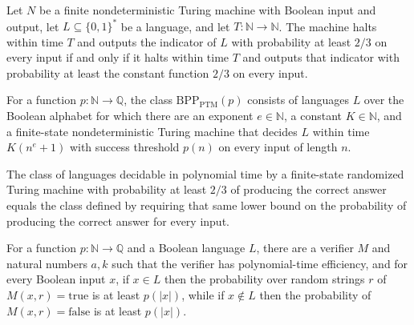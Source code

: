 \begin{theorem}
\label{Turing.FinNDTM.bpDecidesInTime_iff_with}
\leanok
{}
Let $N$ be a finite nondeterministic Turing machine with Boolean input and output, let
$L\subseteq\{0,1\}^*$ be a language, and let $T:\mathbb{N}\to\mathbb{N}$. The machine
halts within time $T$ and outputs the indicator of $L$ with probability at least $2/3$
on every input if and only if it halts within time $T$ and outputs that indicator with
probability at least the constant function $2/3$ on every input.
\end{theorem}

\begin{definition}
\label{Randomized.BPP_PTMWith}
\leanok
{}
For a function $p\colon\mathbb{N}\to\mathbb{Q}$, the class
$\mathrm{BPP}_{\mathrm{PTM}}(p)$ consists of languages $L$ over the Boolean alphabet for
which there are an exponent $e\in\mathbb{N}$, a constant $K\in\mathbb{N}$, and a
finite-state nondeterministic Turing machine that decides $L$ within time $K(n^e+1)$
with success threshold $p(n)$ on every input of length $n$.
\end{definition}

\begin{theorem}
\label{Randomized.BPP_PTM_eq_BPP_PTMWith}
\leanok
{}
The class of languages decidable in polynomial time by a finite-state randomized Turing
machine with probability at least $2/3$ of producing the correct answer equals the class
defined by requiring that same lower bound on the probability of producing the correct
answer for every input.
\end{theorem}

\begin{definition}
\label{Randomized.InBPPWith}
\leanok
{}
For a function $p\colon\mathbb{N}\to\mathbb{Q}$ and a Boolean language $L$, there are a
verifier $M$ and natural numbers $a,k$ such that the verifier has polynomial-time
efficiency, and for every Boolean input $x$, if $x\in L$ then the probability over
random strings $r$ of $M(x,r)=\mathrm{true}$ is at least $p(|x|)$, while if $x\notin L$
then the probability of $M(x,r)=\mathrm{false}$ is at least $p(|x|)$.
\end{definition}

